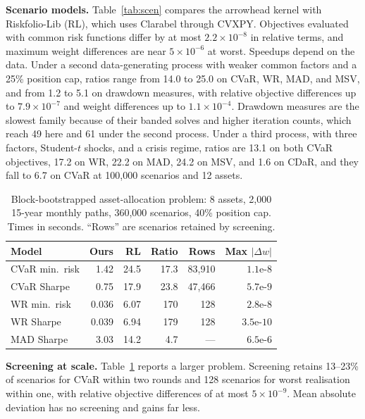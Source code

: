 \documentclass[10pt,twocolumn,letterpaper]{article}
\begin{document}
\textbf{Scenario models.} Table~\ref{tab:scen} compares the arrowhead kernel with Riskfolio-Lib (RL), which uses Clarabel through CVXPY. Objectives evaluated with common risk functions differ by at most $2.2 \times 10^{-8}$ in relative terms, and maximum weight differences are near $5 \times 10^{-6}$ at worst. Speedups depend on the data. Under a second data-generating process with weaker common factors and a 25\% position cap, ratios range from 14.0 to 25.0 on CVaR, WR, MAD, and MSV, and from 1.2 to 5.1 on drawdown measures, with relative objective differences up to $7.9 \times 10^{-7}$ and weight differences up to $1.1 \times 10^{-4}$. Drawdown measures are the slowest family because of their banded solves and higher iteration counts, which reach 49 here and 61 under the second process. Under a third process, with three factors, Student-$t$ shocks, and a crisis regime, ratios are 13.1 on both CVaR objectives, 17.2 on WR, 22.2 on MAD, 24.2 on MSV, and 1.6 on CDaR, and they fall to 6.7 on CVaR at 100,000 scenarios and 12 assets.

\begin{table}[h]
\centering
\caption{Block-bootstrapped asset-allocation problem: 8 assets, 2,000 15-year monthly paths, 360,000 scenarios, 40\% position cap. Times in seconds. ``Rows'' are scenarios retained by screening.}
\label{tab:saa}
\footnotesize
\setlength{\tabcolsep}{3pt}
\begin{tabular}{lrrrrr}
\toprule
Model & Ours & RL & Ratio & Rows & Max $|\Delta w|$ \\
\midrule
CVaR min.\ risk & 1.42 & 24.5 & 17.3 & 83,910 & $1.1\text{e-}8$ \\
CVaR Sharpe & 0.75 & 17.9 & 23.8 & 47,466 & $5.7\text{e-}9$ \\
WR min.\ risk & 0.036 & 6.07 & 170 & 128 & $2.8\text{e-}8$ \\
WR Sharpe & 0.039 & 6.94 & 179 & 128 & $3.5\text{e-}10$ \\
MAD Sharpe & 3.03 & 14.2 & 4.7 & --- & $6.5\text{e-}6$ \\
\bottomrule
\end{tabular}
\end{table}

\textbf{Screening at scale.} Table~\ref{tab:saa} reports a larger problem. Screening retains 13--23\% of scenarios for CVaR within two rounds and 128 scenarios for worst realisation within one, with relative objective differences of at most $5 \times 10^{-9}$. Mean absolute deviation has no screening and gains far less.
\end{document}
